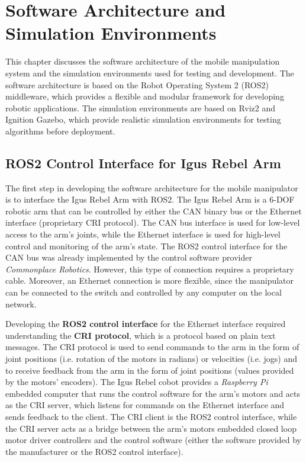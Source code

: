 
\chapter{Software Architecture and Simulation Environments}

This chapter discusses the software architecture of the mobile manipulation system and the simulation 
environments used for testing and development. The software architecture is based on the Robot Operating System 2 (ROS2)
middleware, which provides a flexible and modular framework for developing robotic applications. 
The simulation environments are based on Rviz2 and Ignition Gazebo, which provide realistic simulation environments
for testing algorithms before deployment.

\section{ROS2 Control Interface for Igus Rebel Arm}
\label{sec:ros2control}

The first step in developing the software architecture for the mobile manipulator is to interface the
Igus Rebel Arm with ROS2. The Igus Rebel Arm is a 6-DOF robotic arm that can be controlled by either the CAN binary bus
or the Ethernet interface (proprietary CRI protocol). The CAN bus interface is used for low-level access to the arm's
joints, while the Ethernet interface is used for high-level control and monitoring of the arm's state. 
The ROS2 control interface for the CAN bus was already implemented by the control software provider \textit{Commonplace Robotics}.
However, this type of connection requires a proprietary cable. Moreover, an Ethernet connection is more flexible, since the manipulator can be connected to the switch and controlled by any computer on the local network.

Developing the \textbf{ROS2 control interface} for the Ethernet interface required understanding the \textbf{CRI protocol},
which is a protocol based on plain text messages. The CRI protocol is used to send commands to the arm in the form of
joint positions (i.e. rotation of the motors in radians) or velocities (i.e. jogs) 
and to receive feedback from the arm in the form of joint positions (values provided by the motors' encoders).
The Igus Rebel cobot provides a \textit{Raspberry Pi} embedded computer that runs the control software for the arm's motors
and acts as the CRI server, which listens for commands on the Ethernet interface and sends feedback to the client.
The CRI client is the ROS2 control interface, while the CRI server acts as a bridge between the arm's motors embedded
closed loop motor driver controllers and the control software (either the software provided by the manufacturer or
the ROS2 control interface).

